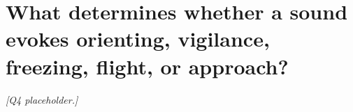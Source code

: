 \section{What determines whether a sound evokes orienting, vigilance, freezing, flight, or approach?}
\label{sec:q4}


\textit{[Q4 placeholder.]}
